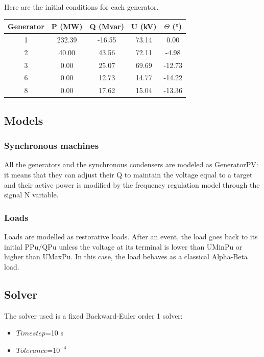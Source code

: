 \documentclass[a4paper, 12pt]{report}
\begin{document}
Here are the initial conditions for each generator.

\begin{center}
\begin{tabular}{|c|c|c|c|c|}
  \hline
  Generator & P (MW) & Q (Mvar) & U (kV) & $\Theta$ (°) \\
  \hline
  1 & 232.39 & -16.55 & 73.14 & 0.00\\
  2 & 40.00 & 43.56 & 72.11 & -4.98\\
  3 & 0.00 & 25.07 & 69.69 & -12.73\\
  6 & 0.00 & 12.73 & 14.77 & -14.22\\
  8 & 0.00 & 17.62 & 15.04 & -13.36\\
  \hline
\end{tabular}
\end{center}

\subsection{Models}

\subsubsection{Synchronous machines}

All the generators and the synchronous condensers are modeled as GeneratorPV: it means that they can adjust their Q to maintain the voltage equal to a target and their active power is modified by the frequency regulation model through the signal N variable.

\subsubsection{Loads}

Loads are modelled as restorative loads. After an event, the load goes back to its initial PPu/QPu unless the voltage at its terminal is lower than UMinPu or higher than UMaxPu. In this case, the load behaves as a classical Alpha-Beta load.

\subsection{Solver}
The solver used is a fixed Backward-Euler order 1 solver:
\begin{itemize}
\item $Time step$=10 s
\item $Tolerance$=$10^{-4}$
\end{itemize}
\end{document}
